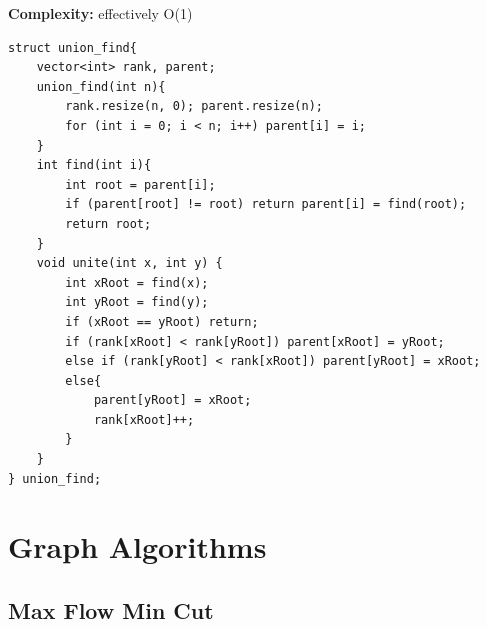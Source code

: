 \documentclass[10pt,a4paper]{article}
\begin{document}
\textbf{Complexity:} effectively O(1)
\begin{verbatim}
struct union_find{
    vector<int> rank, parent;
    union_find(int n){
        rank.resize(n, 0); parent.resize(n);
        for (int i = 0; i < n; i++) parent[i] = i;
    }
    int find(int i){
        int root = parent[i];
        if (parent[root] != root) return parent[i] = find(root);
        return root;
    }
    void unite(int x, int y) {
        int xRoot = find(x);
        int yRoot = find(y);
        if (xRoot == yRoot) return;
        if (rank[xRoot] < rank[yRoot]) parent[xRoot] = yRoot;
        else if (rank[yRoot] < rank[xRoot]) parent[yRoot] = xRoot;
        else{
            parent[yRoot] = xRoot;
            rank[xRoot]++;
        }
    }
} union_find;
\end{verbatim}

\section{Graph Algorithms}

\subsection{Max Flow Min Cut}
\end{document}
